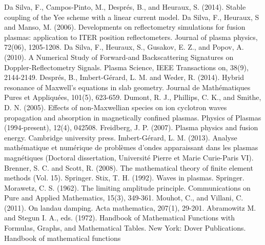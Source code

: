 \documentclass[proc]{edpsmath}
\begin{document}
\begin{thebibliography}{99}
 Da Silva, F., Campos-Pinto, M., Després, B., and Heuraux, S. (2014). Stable coupling of the Yee scheme with a linear current model.
 Da Silva, F., Heuraux, S and  Manso, M. (2006). Developments on reflectometry simulations for fusion plasmas: application to ITER position reflectometers. Journal of plasma physics, 72(06), 1205-1208.
Da Silva, F., Heuraux, S., Gusakov, E. Z., and Popov, A. (2010). A Numerical Study of Forward-and Backscattering Signatures on Doppler-Reflectometry Signals. Plasma Science, IEEE Transactions on, 38(9), 2144-2149.
 Després, B., Imbert-Gérard, L. M. and Weder, R. (2014). Hybrid resonance of Maxwell's equations in slab geometry. Journal de Mathématiques Pures et Appliquées, 101(5), 623-659.
 Dumont, R. J., Phillips, C. K., and Smithe, D. N. (2005). Effects of non-Maxwellian species on ion cyclotron waves propagation and absorption in magnetically confined plasmas. Physics of Plasmas (1994-present), 12(4), 042508.
 Freidberg, J. P. (2007). Plasma physics and fusion energy. Cambridge university press.
 Imbert-Gérard, L. M. (2013). Analyse mathématique et numérique de problèmes d'ondes apparaissant dans les plasmas magnétiques (Doctoral dissertation, Université Pierre et Marie Curie-Paris VI).
 Brenner, S. C. and Scott, R. (2008). The mathematical theory of finite element methods (Vol. 15). Springer.
 Stix, T. H. (1992). Waves in plasmas. Springer.
 Morawetz, C. S. (1962). The limiting amplitude principle. Communications on Pure and Applied Mathematics, 15(3), 349-361.
 Mouhot, C., and Villani, C. (2011). On landau damping. Acta mathematica, 207(1), 29-201.
 Abramowitz M. and Stegun I. A., eds. (1972). Handbook of Mathematical Functions with Formulas, Graphs, and Mathematical Tables. New York: Dover Publications.
Handbook of mathematical functions
\end{thebibliography}
\end{document}
